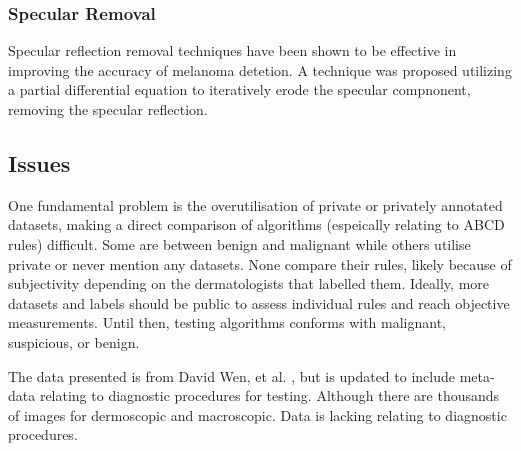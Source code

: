 \subsubsection{Specular Removal}
Specular reflection removal techniques have been shown to be effective in improving the accuracy of melanoma detetion\cite{Shen2009}. A technique was proposed utilizing a partial differential equation to iteratively erode the specular compnonent, removing the specular reflection\cite{Shen2009}.


\subsection{Issues}
One fundamental problem is the overutilisation of private or privately annotated datasets, making a direct comparison of algorithms (espeically relating to ABCD rules) difficult. Some are between benign and malignant\cite{Meskini2018, Kasmi2016, Ali2020b, Ali2020a} while others utilise private or never mention any datasets\cite{Kasmi2016, She2007, Tenenhaus2010, Ramezani2014, Zaqout2016}. None compare their rules, likely because of subjectivity depending on the dermatologists that labelled them. Ideally, more datasets and labels should be public to assess individual rules and reach objective measurements. Until then, testing algorithms conforms with malignant, suspicious, or benign.


The data presented is from David Wen, et al. \cite{Wen2022}, but is updated to include meta-data relating to diagnostic procedures for testing. Although there are thousands of images for dermoscopic and macroscopic. Data is lacking relating to diagnostic procedures.